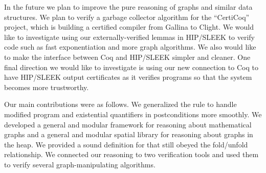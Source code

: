 In the future we plan to improve the pure reasoning of graphs and
similar data structures.  We plan to verify a garbage
collector algorithm for the ``CertiCoq'' project, which is building 
a certified compiler from Gallina to Clight. We would like to investigate
using our externally-verified lemmas in HIP/SLEEK to verify code such as fast
exponentiation and more graph algorithms. We also would like to make
the interface between Coq and HIP/SLEEK simpler and cleaner.
One final direction we would like to investigate is using our new
connection to Coq to have HIP/SLEEK output certificates as it 
verifies programs so that the system becomes more trustworthy.

Our main contributions were as follows.  We generalized the 
rule to handle modified program and existential quantifiers in postconditions
more smoothly.  We developed a general and modular framework for reasoning
about mathematical graphs and a general and modular spatial library for
reasoning about graphs in the heap.  We provided a sound definition for 
that still obeyed the fold/unfold relationship.  We connected our reasoning
to two verification tools and used them to verify several graph-manipulating algorithms.
